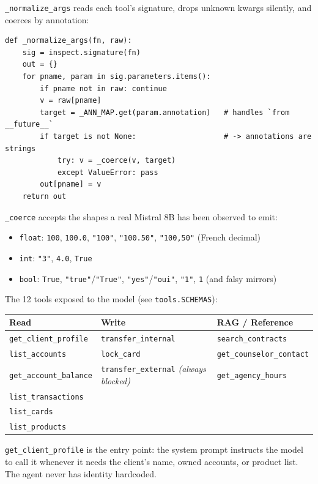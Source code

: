 \documentclass[11pt]{article}
\begin{document}
\texttt{\_normalize\_args} reads each tool's signature, drops unknown kwargs silently, and coerces by annotation:

\begin{lstlisting}[style=py]
def _normalize_args(fn, raw):
    sig = inspect.signature(fn)
    out = {}
    for pname, param in sig.parameters.items():
        if pname not in raw: continue
        v = raw[pname]
        target = _ANN_MAP.get(param.annotation)   # handles `from __future__`
        if target is not None:                    # -> annotations are strings
            try: v = _coerce(v, target)
            except ValueError: pass
        out[pname] = v
    return out
\end{lstlisting}

\texttt{\_coerce} accepts the shapes a real Mistral 8B has been observed to emit:

\begin{itemize}[leftmargin=*]
  \item \texttt{float}: \texttt{100}, \texttt{100.0}, \texttt{"100"}, \texttt{"100.50"}, \texttt{"100,50"} (French decimal)
  \item \texttt{int}: \texttt{"3"}, \texttt{4.0}, \texttt{True}
  \item \texttt{bool}: \texttt{True}, \texttt{"true"}/\texttt{"True"}, \texttt{"yes"}/\texttt{"oui"}, \texttt{"1"}, \texttt{1} (and falsy mirrors)
\end{itemize}

The 12 tools exposed to the model (see \texttt{tools.SCHEMAS}):

\begin{longtable}{@{}lll@{}}
\toprule
\textbf{Read} & \textbf{Write} & \textbf{RAG / Reference} \\
\midrule
\endhead
\texttt{get\_client\_profile} & \texttt{transfer\_internal} & \texttt{search\_contracts} \\
\texttt{list\_accounts} & \texttt{lock\_card} & \texttt{get\_counselor\_contact} \\
\texttt{get\_account\_balance} & \texttt{transfer\_external} \emph{(always blocked)} & \texttt{get\_agency\_hours} \\
\texttt{list\_transactions} & & \\
\texttt{list\_cards} & & \\
\texttt{list\_products} & & \\
\bottomrule
\end{longtable}

\texttt{get\_client\_profile} is the entry point: the system prompt instructs the model to call it whenever it needs the client's name, owned accounts, or product list. The agent never has identity hardcoded.
\end{document}
